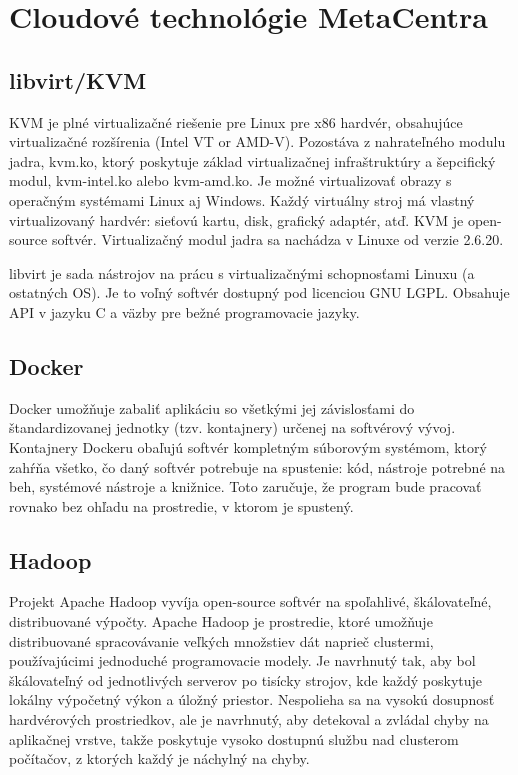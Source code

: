 \documentclass[11pt,final,oneside]{fithesis}
\begin{document}
\section{Cloudové technológie MetaCentra}
\subsection{libvirt/KVM}
KVM\footnotemark{} je plné virtualizačné riešenie pre Linux pre x86 hardvér, obsahujúce virtualizačné rozšírenia (Intel VT or AMD-V).
Pozostáva z nahrateľného modulu jadra, kvm.ko, ktorý poskytuje základ virtualizačnej infraštruktúry a šepcifický modul, kvm-intel.ko alebo kvm-amd.ko. Je možné virtualizovať obrazy 
s operačným systémami Linux aj Windows. Každý virtuálny stroj má vlastný virtualizovaný hardvér: sieťovú kartu, disk, grafický adaptér, atď. KVM je open-source softvér. Virtualizačný modul jadra
sa nachádza v Linuxe od verzie 2.6.20.\cite{kvm}

libvirt je sada nástrojov na prácu s virtualizačnými schopnosťami Linuxu (a ostatných OS). Je to voľný softvér dostupný pod licenciou GNU LGPL. 
Obsahuje API v jazyku C a väzby pre bežné programovacie jazyky.\cite{libvirt}

\subsection{Docker}
Docker umožňuje zabaliť aplikáciu so všetkými jej závislosťami do štandardizovanej jednotky (tzv. kontajnery) určenej na softvérový vývoj. Kontajnery Dockeru obaľujú softvér kompletným súborovým systémom, ktorý
zahŕňa všetko, čo daný softvér potrebuje na spustenie: kód, nástroje potrebné na beh, systémové nástroje a knižnice. Toto zaručuje, že program bude pracovať rovnako bez ohľadu na prostredie, v ktorom
je spustený.\cite{docker}


\subsection{Hadoop}
Projekt Apache Hadoop vyvíja open-source softvér na spoľahlivé, škálovateľné, distribuované výpočty. Apache Hadoop je prostredie, ktoré umožňuje distribuované spracovávanie veľkých množstiev dát
naprieč clustermi, používajúcimi jednoduché programovacie modely. Je navrhnutý tak, aby bol škálovateľný od jednotlivých serverov po tisícky strojov, kde každý poskytuje lokálny výpočetný výkon a úložný priestor.
Nespolieha sa na vysokú dosupnosť hardvérových prostriedkov, ale je navrhnutý, aby detekoval a zvládal chyby na aplikačnej vrstve, takže poskytuje vysoko dostupnú službu nad clusterom počítačov, 
z ktorých každý je náchylný na chyby.
\end{document}

